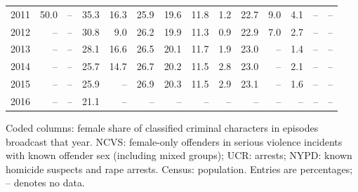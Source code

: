 \begin{center}
\begin{tabular}{@{}rrrrrrrrrrrrrr@{}}
2011 & 50.0 & -- & 35.3 & 16.3 & 25.9 & 19.6 & 11.8 & 1.2 & 22.7 & 9.0 & 4.1 & -- & -- \\
2012 & -- & -- & 30.8 & 9.0 & 26.2 & 19.9 & 11.3 & 0.9 & 22.9 & 7.0 & 2.7 & -- & -- \\
2013 & -- & -- & 28.1 & 16.6 & 26.5 & 20.1 & 11.7 & 1.9 & 23.0 & -- & 1.4 & -- & -- \\
2014 & -- & -- & 25.7 & 14.7 & 26.7 & 20.2 & 11.5 & 2.8 & 23.0 & -- & 2.1 & -- & -- \\
2015 & -- & -- & 25.9 & -- & 26.9 & 20.3 & 11.5 & 2.9 & 23.1 & -- & 1.6 & -- & -- \\
2016 & -- & -- & 21.1 & -- & -- & -- & -- & -- & -- & -- & -- & -- & -- \\
\bottomrule
\end{tabular}
\par\smallskip
\parbox{\linewidth}{\footnotesize\raggedright Coded columns: female share of classified criminal characters in episodes broadcast that year. NCVS: female-only offenders in serious violence incidents with known offender sex (including mixed groups); UCR: arrests; NYPD: known homicide suspects and rape arrests. Census: population.  Entries are percentages; -- denotes no data.}
\end{center}
